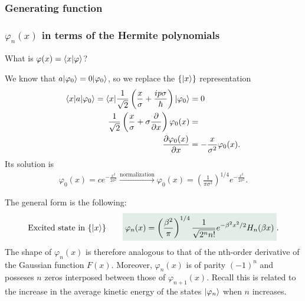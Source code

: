 \subsubsection{Generating function}

%
\subsubsection{$\varphi_n(x)$ in terms of the Hermite polynomials}
What is $\varphi(x)=\langle x|\varphi\rangle$?

We know that $a|\varphi_0\rangle=0|\varphi_0\rangle$, so we replace the $\{|x\rangle\}$ representation 
\begin{align*}
    \langle x|a|\varphi_0\rangle=\langle x|\frac{1}{\sqrt{2}}\left(\frac{x}{\sigma}+\frac{ip\sigma}{\hbar}\right)|\varphi_0\rangle&=0\\
    \frac{1}{\sqrt{2}}\left(\frac{x}{\sigma}+\sigma\frac{\partial}{\partial x}\right)\varphi_0(x)&=\\
    \frac{\partial\varphi_0(x)}{\partial x}&=-\frac{x}{\sigma^2}\varphi_0(x).
\end{align*}
Its solution is 
\begin{align*}
    \varphi_0(x)=ce^{-\frac{x^2}{2\sigma^2}}\stackrel{\text{normalization}}{\longrightarrow}\varphi_0(x)=\left(\frac{1}{\pi\sigma^2}\right)^{1/4}e^{-\frac{x^2}{2\sigma^2}}.
\end{align*}

The general form is the following:
\begin{align}
    \text{Excited state in $\{\ket{x}\}$}\qquad\highlight{\varphi_n(x)=
    \left(\frac{\beta^2}{\pi}\right)^{1/4}\frac{1}{\sqrt{2^nn!}}e^{-\beta^2x^2/2}H_n(\beta x)}.
\end{align}
The shape of $\varphi_n(x)$ is therefore analogous to that of the nth-order derivative of the Gaussian function $F(x)$. Moreover, $\varphi_n(x)$ is of parity 
$(-1)^n$ and posseses $n$ zeros interposed between those of $\varphi_{n+1}(x)$. Recall this is related to the increase in the average kinetic energy of the 
states $|\varphi_n\rangle$ when $n$ increases.
%
